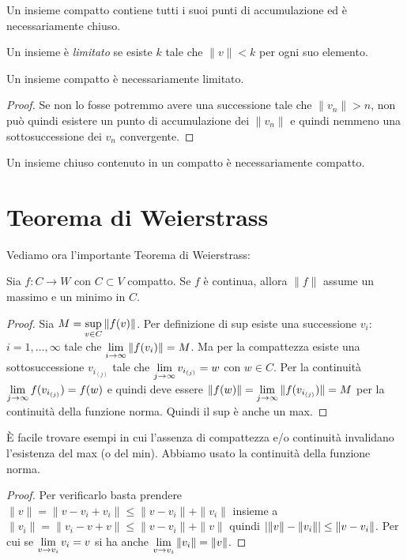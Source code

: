 Un insieme compatto contiene tutti i suoi punti di accumulazione ed
è necessariamente chiuso.

\begin{definition}[limitato]
Un insieme è \emph{limitato} se esiste $k$ tale che $\|v\| < k$ per ogni
suo elemento.
\end{definition}

\begin{lemma}
Un insieme compatto è necessariamente limitato.
\end{lemma}
\begin{proof}
Se non lo fosse potremmo avere una successione tale che $\|v_n\| > n$, non
può quindi esistere un punto di accumulazione dei $\|v_n\|$ e quindi nemmeno
una sottosuccessione dei $v_n$ convergente.
\end{proof}
\begin{corollary}
Un insieme chiuso contenuto in un compatto è necessariamente compatto.
\end{corollary}

\section{Teorema di Weierstrass}
Vediamo ora l'importante Teorema di Weierstrass:
\begin{theorem}[di Weierstrass]
Sia $f: C \to W$ con $C \subset V$ compatto. Se $f$ è continua, allora
$\|f\|$ assume un massimo e un minimo in $C$.
\end{theorem}
\begin{proof}
Sia $\displaystyle M = \sup_{v \in C} \|f(v)\|$. Per definizione di sup esiste una
successione $v_i$: $i = 1, \ldots, \infty$ tale che 
$ \displaystyle \lim_{i \to \infty} \|f(v_i)\| = M$. Ma per la compattezza esiste
una sottosuccessione $v_{i_{(j)}}$ tale che 
$\displaystyle \lim_{j \to \infty} v_{i_{(j)}} = w$ con $w \in C$.
Per la continuità $\displaystyle \lim_{j \to \infty} f(v_{i_{(j)}}) = f(w)$ e quindi
deve essere $ \displaystyle \|f(w)\| = \lim_{j \to \infty} \|f(v_{i_{(j)}})\| = M$
per la continuità della funzione norma. Quindi il sup è anche un max. 
\end{proof}
È facile trovare esempi in cui l'assenza di compattezza e/o continuità
invalidano l'esistenza del max (o del min).
Abbiamo usato la continuità della funzione norma.
\begin{proof}
Per verificarlo basta prendere $\|v\|=\|v-v_i+v_i\| \leq \|v-v_i\|+\|v_i\|$
insieme a $\|v_i\| = \|v_i - v + v\| \leq \|v - v_i\| + \|v\|$ quindi
${\left|\|v\| - \|v_i\|\right|} \leq \|v-v_i\|$. Per cui se 
$\displaystyle \lim_{v \to v_i} v_i = v$ si ha anche
$\displaystyle \lim_{v \to v_i} \|v_i\| = \|v\|$.
\end{proof}

